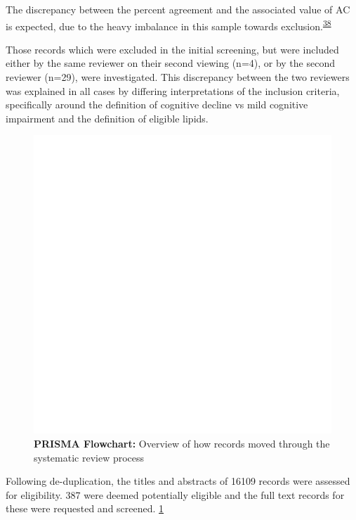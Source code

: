 \documentclass[a4paper, twoside]{templates/ociamthesis}
\begin{document}
The discrepancy between the percent agreement and the associated value of AC is expected, due to the heavy imbalance in this sample towards exclusion.\textsuperscript{\protect\hyperlink{ref-feinstein1990}{38}}

Those records which were excluded in the initial screening, but were included either by the same reviewer on their second viewing (n=4), or by the second reviewer (n=29), were investigated. This discrepancy between the two reviewers was explained in all cases by differing interpretations of the inclusion criteria, specifically around the definition of cognitive decline vs mild cognitive impairment and the definition of eligible lipids.





\begin{figure}
\includegraphics[width=1\linewidth]{figures/sys-rev/prismaflow} \caption[PRISMA Flowchart]{\textbf{PRISMA Flowchart:} Overview of how records moved through the systematic review process}\label{fig:prisma-flow-fig}
\end{figure}

Following de-duplication, the titles and abstracts of 16109 records were assessed for eligibility. 387 were deemed potentially eligible and the full text records for these were requested and screened. \ref{fig:prisma-flow-fig}
\end{document}
